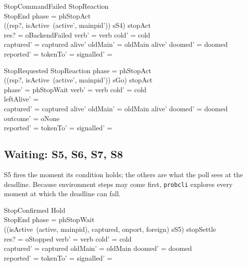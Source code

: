 \documentclass[a4paper,10pt,fleqn]{article}
\begin{document}
\begin{schema}{StopCommandFailed}
  StopReaction \\
  StopEnd
\where
  phase = phStopAct \\
  ((rsp?, isActive~(active', mainpid')) \mapsto sS4) \in stopAct \\
  res? = oBackendFailed \land verb' = verb \land cold' = cold \\
  captured' = captured \cap alive' \land oldMain' = oldMain \cap alive' \land
    doomed' = doomed \\
  reported' = \emptyset \land tokenTo' = \emptyset \land
    signalled' = \emptyset
\end{schema}

\begin{schema}{StopRequested}
  StopReaction
\where
  phase = phStopAct \\
  ((rsp?, isActive~(active', mainpid')) \mapsto sGo) \in stopAct \\
  phase' = phStopWait \land verb' = verb \land cold' = cold \\
  leftAlive' = \emptyset \\
  captured' = captured \cap alive' \land oldMain' = oldMain \cap alive' \land
    doomed' = doomed \\
  outcome' = oNone \\
  reported' = \emptyset \land tokenTo' = \emptyset \land
    signalled' = \emptyset
\end{schema}

\subsection{Waiting: S5, S6, S7, S8}

S5 fires the moment its condition holds; the others are what the poll sees at
the deadline. Because environment steps may come first, \texttt{probcli}
explores every moment at which the deadline can fall.

\begin{schema}{StopConfirmed}
  Hold \\
  StopEnd
\where
  phase = phStopWait \\
  ((isActive~(active, mainpid), captured, onport, foreign) \mapsto sS5) \in stopSettle \\
  res? = oStopped \land verb' = verb \land cold' = cold \\
  captured' = captured \land oldMain' = oldMain \land doomed' = doomed \\
  reported' = \emptyset \land tokenTo' = \emptyset \land
    signalled' = \emptyset
\end{schema}
\end{document}
